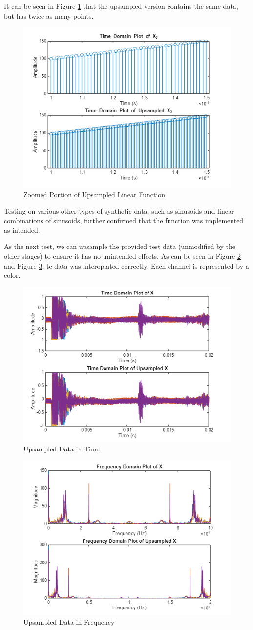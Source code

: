 It can be seen  in Figure \ref{fig:linear_upsample_zoom} that the upsampled version contains the same data, but has twice as many points.

\begin{figure}[H]
    \centering
    \includegraphics[width=0.5\linewidth]{figures/linear_upsample_zoom.png}
    \caption{Zoomed Portion of Upsampled Linear Function}
    \label{fig:linear_upsample_zoom}
\end{figure}

Testing on various other types of synthetic data, such as sinusoids and linear combinations of sinusoids, further confirmed that the function was implemented as intended.  

As the next test, we can upsample the provided test data (unmodified by the other stages) to ensure it has no unintended effects.  As can be seen in Figure \ref{fig:upsample_time} and Figure \ref{fig:upsample_freq}, te data was interoplated correctly.  Each channel is represented by a color.

\begin{figure}[H]
    \centering
    \includegraphics[width=0.5\linewidth]{figures/upsample_time.png}
    \caption{Upsampled Data in Time}
    \label{fig:upsample_time}
\end{figure}

\begin{figure}[H]
    \centering
    \includegraphics[width=0.5\linewidth]{figures/upsample_freq.png}
    \caption{Upsampled Data in Frequency}
    \label{fig:upsample_freq}
\end{figure}

